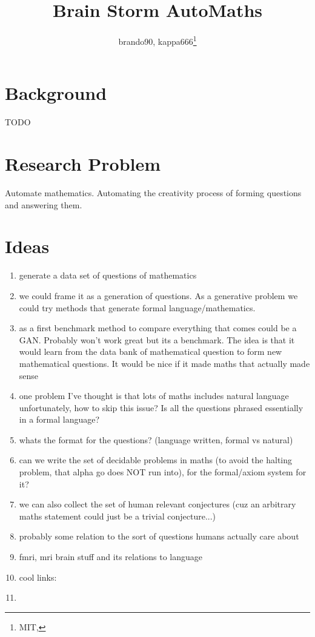 \documentclass[11pt]{article}
\title{Brain Storm AutoMaths}
\author{brando90, kappa666\footnote{ MIT, \email{brando90, kappa666}}}
\makeatletter
\let\inserttitle\@title
\let\insertauthor\@author
\makeatother
\begin{document}
\begin{center}
  \LARGE{\inserttitle}

  \Large{\insertauthor}
\end{center}

\section{Background}

TODO

\section{Research Problem}

Automate mathematics. Automating the creativity process of forming questions and answering them. 

\section{Ideas}

\begin{enumerate}
\item generate a data set of questions of mathematics
\item we could frame it as a generation of questions. As a generative problem we could try methods that generate formal language/mathematics.
\item as a first benchmark method to compare everything that comes could be a GAN. Probably won't work great but its a benchmark. The idea is that it would learn from the data bank of mathematical question to form new mathematical questions. It would be nice if it made maths that actually made sense
\item one problem I've thought is that lots of maths includes natural language unfortunately, how to skip this issue? Is all the questions phrased essentially in a formal language?
\item whats the format for the questions? (language written, formal vs natural)
\item can we write the set of decidable problems in maths (to avoid the halting problem, that alpha go does NOT run into), for the formal/axiom system for it?
\item we can also collect the set of human relevant conjectures (cuz an arbitrary maths statement could just be a trivial conjecture...)
\item probably some relation to the sort of questions humans actually care about
\item fmri, mri brain stuff and its relations to language
\item cool links: %
\item 
\end{enumerate}
\end{document}
